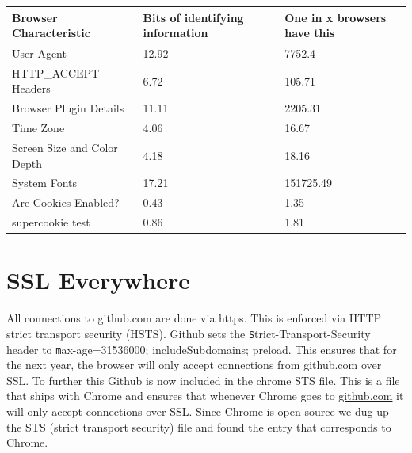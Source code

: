 \documentclass[12pt]{article}
\makeatletter
\renewcommand{\tt}[1]{\texttt{#1}}
\renewenvironment{figure}
               {\def\@captype {figure}}
               {}
\renewenvironment{table}
               {\def\@captype {table}}
               {}
\makeatother
\begin{document}
\begin{enumerate}
\begin{figure}
\begin{table}
\begin{tabular}{| l | p{4cm} | p{4cm} |}
\hline
\textbf{Browser Characteristic} & \textbf{Bits of identifying information} & \textbf{One in x browsers have this} \\ \hline
User Agent & 12.92  & 7752.4 \\ \hline
HTTP\_ACCEPT Headers   & 6.72   & 105.71  \\ \hline
Browser Plugin Details          & 11.11 & 2205.31  \\ \hline
Time Zone                       & 4.06                                     & 16.67                                \\ \hline
Screen Size and Color Depth     & 4.18                                     & 18.16                                \\ \hline
System Fonts                    & 17.21                                    & 151725.49                            \\ \hline
Are Cookies Enabled?            & 0.43                                     & 1.35                                 \\ \hline
supercookie test                & 0.86                                     & 1.81                                 \\ \hline
\end{tabular}
\caption{Browser Fingerprint\newline}
\label{fig:mig_over}
\end{table}
\end{figure}


\end{enumerate}



\section{SSL Everywhere}

All connections to github.com are done via https. This is enforced via HTTP strict transport security (HSTS). Github sets the {\tt Strict-Transport-Security} header to {\tt max-age=31536000; includeSubdomains; preload}. This ensures that for the next year, the browser will only accept connections from github.com over SSL. To further this Github is now included in the chrome STS file. This is a file that ships with Chrome and ensures that whenever Chrome goes to \url{github.com} it will only accept connections over SSL. Since Chrome is open source we dug up the STS (strict transport security) file and found the entry that corresponds to Chrome.
\end{document}
